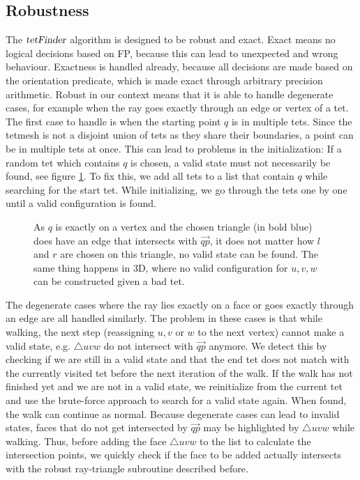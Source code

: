 \documentclass[../thesis.tex]{subfiles}
\begin{document}
\subsection{Robustness}\label{subsec:degenerate}
The $\textsl{tetFinder}$ algorithm is designed to be robust and exact.
Exact means no logical decisions
based on FP, because this can lead to unexpected and wrong behaviour.
Exactness is handled already, because all decisions are made based on the orientation predicate,
which is made exact through arbitrary precision arithmetic.
Robust in our context means that it is able to handle degenerate cases, for example when
the ray goes exactly through an edge or vertex of a tet.
The first case to handle is when the starting point $q$ is in multiple tets.
Since the tetmesh is not a disjoint union of tets as they share their boundaries,
a point can be in multiple tets at once. This can lead to problems in the initialization:
If a random tet which contains $q$ is chosen, a valid state must not necessarily be found, see figure \ref{fig:validstatefail}.
To fix this, we add all tets to a list that contain $q$ while searching for the start tet.
While initializing, we go through the tets one by one until a valid configuration is found.
\begin{figure}[htb]
  \centering
  \def\svgwidth{15em}
  
  \caption{As $q$ is exactly on a vertex and the chosen triangle (in bold blue) does
  have an edge that intersects with $\Vec{qp}$,
  it does not matter how $l$ and $r$ are chosen on this triangle, no valid state can be found.
  The same thing happens in 3D, where no valid configuration for $u,v,w$ can be constructed given a bad tet.
  }\label{fig:validstatefail}
\end{figure}
The degenerate cases where the ray lies exactly on a face or goes exactly through an edge are all handled similarly.
The problem in these cases is that while walking, the next step (reassigning $u,v$ or $w$ to the next vertex) cannot
make a valid state, e.g. $\triangle uvw$ do not intersect with $\Vec{qp}$ anymore.
We detect this by checking if we are still in a valid state and that the end tet does not
match with the currently visited tet before the next iteration of the walk.
If the walk has not finished yet and we are not in a valid state, we reinitialize from the current tet and use the brute-force approach to search
for a valid state again. When found, the walk can continue as normal.
Because degenerate cases can lead to invalid states, faces that do not get intersected
by $\Vec{qp}$ may be highlighted by $\triangle uvw$ while walking.
Thus, before adding the face $\triangle uvw$ to the list to calculate the intersection points,
we quickly check if the face to be added actually intersects with the robust ray-triangle subroutine described before.
\end{document}
